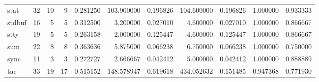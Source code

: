 \begin{longtable}{lrrrrrrrrrr}
stat      &                                      32 &                 10 &                                 9 &                                   0.281250 &                             103.900000 &                                     0.196826 &                        104.600000 &                                0.196826 &                           1.000000 &                                           0.933333 \\
stdbuf    &                                      16 &                  5 &                                 5 &                                   0.312500 &                               3.200000 &                                     0.027010 &                          4.600000 &                                0.027010 &                           1.000000 &                                           0.866667 \\
stty      &                                      19 &                  5 &                                 5 &                                   0.263158 &                               2.000000 &                                     0.125447 &                          4.600000 &                                0.125447 &                           1.000000 &                                           0.866667 \\
sum       &                                      22 &                  8 &                                 8 &                                   0.363636 &                               5.875000 &                                     0.066238 &                          6.750000 &                                0.066238 &                           1.000000 &                                           0.750000 \\
sync      &                                      11 &                  3 &                                 3 &                                   0.272727 &                               2.666667 &                                     0.042412 &                          5.000000 &                                0.042412 &                           1.000000 &                                           0.888889 \\
tac       &                                      33 &                 19 &                                17 &                                   0.515152 &                             148.578947 &                                     0.619618 &                        434.052632 &                                0.151485 &                           0.947368 &                                           0.771930 \\

\end{longtable}
